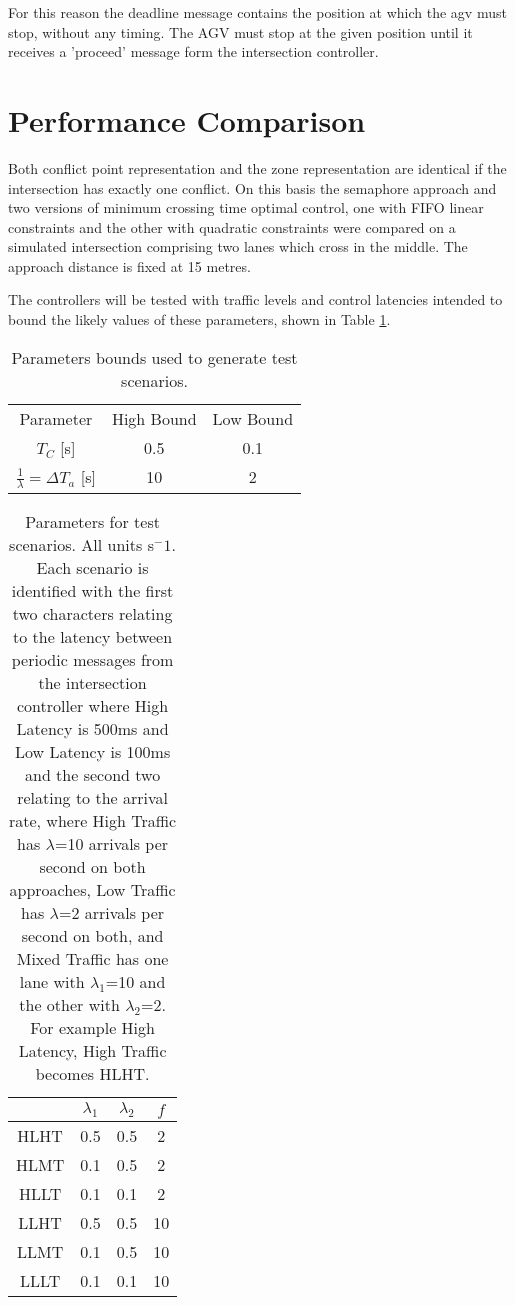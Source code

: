 For this reason the deadline message contains the position at which the agv must stop, without any timing. The AGV must stop at the given position until it receives a 'proceed' message form the intersection controller.

\section{Performance Comparison}
Both conflict point representation and the zone representation are identical if the intersection has exactly one conflict. On this basis the semaphore approach and two versions of minimum crossing time optimal control, one with FIFO linear constraints and the other with quadratic constraints were compared on a simulated intersection comprising two lanes which cross in the middle. The approach distance is fixed at 15 metres.

The controllers will be tested with traffic levels and control latencies intended to bound the likely values of these parameters, shown in Table \ref{tab:test_params}.

\begin{table}
	\caption{Parameters bounds used to generate test scenarios.}
	\label{tab:test_params} 
	\centering
	\begin{tabular}{ |c|c|c| }
		\hline
		Parameter & High Bound & Low Bound \\
		$T_C$ [s]& 0.5 & 0.1 \\ 
		$\frac{1}{\lambda}=\Delta T_a$ [s]& 10 & 2 \\ 	
		\hline
	\end{tabular}
\end{table}

\begin{table}
	\begin{tabular}{|c|c|c|c|}
		\hline
		& $\lambda_1$ & $\lambda_2$ & $f$ \\
		\hline
		HLHT & 0.5 & 0.5 & 2 \\
		HLMT & 0.1 & 0.5 & 2 \\
		HLLT & 0.1 & 0.1 & 2 \\
		LLHT & 0.5 & 0.5 & 10 \\
		LLMT & 0.1 & 0.5 & 10 \\
		LLLT & 0.1 & 0.1 & 10 \\
		\hline
	\end{tabular}
	\label{tab:params}
	\caption{Parameters for test scenarios. All units s$^-1$. Each scenario is identified with the first two characters relating to the latency between periodic messages from the intersection controller where High Latency is 500ms and  Low Latency is 100ms and the second two relating to the arrival rate, where High Traffic has $\lambda$=10 arrivals per second on both approaches, Low Traffic has $\lambda$=2 arrivals per second on both, and Mixed Traffic has one lane with $\lambda_1$=10 and the other with $\lambda_2$=2. For example High Latency, High Traffic becomes HLHT.}
\end{table}

